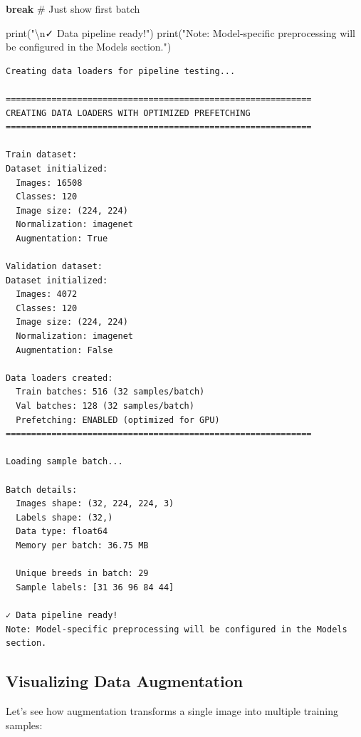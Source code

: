 \documentclass[
  letterpaper,
  DIV=11,
  numbers=noendperiod]{scrartcl}
\newenvironment{Shaded}{\begin{snugshade}}{\end{snugshade}}
\newcommand{\BuiltInTok}[1]{\textcolor[rgb]{0.00,0.23,0.31}{#1}}
\newcommand{\CharTok}[1]{\textcolor[rgb]{0.13,0.47,0.30}{#1}}
\newcommand{\CommentTok}[1]{\textcolor[rgb]{0.37,0.37,0.37}{#1}}
\newcommand{\ControlFlowTok}[1]{\textcolor[rgb]{0.00,0.23,0.31}{\textbf{#1}}}
\newcommand{\NormalTok}[1]{\textcolor[rgb]{0.00,0.23,0.31}{#1}}
\newcommand{\StringTok}[1]{\textcolor[rgb]{0.13,0.47,0.30}{#1}}
\renewenvironment{Shaded}{%
  \begin{tcolorbox}[%
    enhanced,%
    colback=codebg,%
    colframe=codebg,%
    borderline west={3pt}{0pt}{sectionblue},%
    boxrule=0pt,%
    arc=0pt,%
    boxsep=5pt,%
    left=2mm,%
    right=2mm,%
    top=2mm,%
    bottom=2mm%
  ]%
}{%
  \end{tcolorbox}%
}
\begin{document}
\begin{Shaded}
\begin{Highlighting}[]
    \ControlFlowTok{break}  \CommentTok{\# Just show first batch}

\BuiltInTok{print}\NormalTok{(}\StringTok{"}\CharTok{\textbackslash{}n}\StringTok{✓ Data pipeline ready!"}\NormalTok{)}
\BuiltInTok{print}\NormalTok{(}\StringTok{"Note: Model{-}specific preprocessing will be configured in the Models section."}\NormalTok{)}
\end{Highlighting}
\end{Shaded}

\begin{verbatim}
Creating data loaders for pipeline testing...

============================================================
CREATING DATA LOADERS WITH OPTIMIZED PREFETCHING
============================================================

Train dataset:
Dataset initialized:
  Images: 16508
  Classes: 120
  Image size: (224, 224)
  Normalization: imagenet
  Augmentation: True

Validation dataset:
Dataset initialized:
  Images: 4072
  Classes: 120
  Image size: (224, 224)
  Normalization: imagenet
  Augmentation: False

Data loaders created:
  Train batches: 516 (32 samples/batch)
  Val batches: 128 (32 samples/batch)
  Prefetching: ENABLED (optimized for GPU)
============================================================

Loading sample batch...

Batch details:
  Images shape: (32, 224, 224, 3)
  Labels shape: (32,)
  Data type: float64
  Memory per batch: 36.75 MB

  Unique breeds in batch: 29
  Sample labels: [31 36 96 84 44]

✓ Data pipeline ready!
Note: Model-specific preprocessing will be configured in the Models section.
\end{verbatim}

\subsection{Visualizing Data
Augmentation}\label{visualizing-data-augmentation}

Let's see how augmentation transforms a single image into multiple
training samples:
\end{document}
